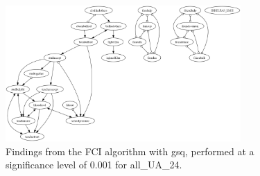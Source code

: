 \begin{figure}[htbp]
    \centering
    \includegraphics[width=0.8\textwidth]{FCI_gsq_0.001_all_UA_24.png}
    \caption{Findings from the FCI algorithm with gsq, performed at a significance level of 0.001 for all_UA_24.}
    \label{fig:fci_gsq_0.001all_UA_24}
\end{figure}
